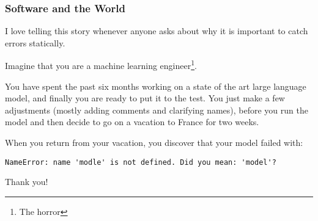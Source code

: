 \documentclass[aspectratio=169]{beamer}
\begin{document}
\begin{frame}[fragile]
  \frametitle{Software and the World}

  I love telling this story whenever anyone asks about why it is important
  to catch errors statically.

  Imagine that you are a machine learning engineer\footnote{The horror}.

  You have spent the past six months working on a state of the art large
  language model, and finally you are ready to put it to the test. You just
  make a few adjustments (mostly adding comments and clarifying names),
  before you run the model and then decide to go on a vacation to France for
  two weeks.

  When you return from your vacation, you discover that your model failed
  with:
  {\small
  \begin{lstlisting}[style=15150code, numbers=none]
    NameError: name 'modle' is not defined. Did you mean: 'model'?
  \end{lstlisting}
  }
\end{frame}




\begin{frame}[plain]
	\begin{center} Thank you! \end{center}
\end{frame}
\end{document}
